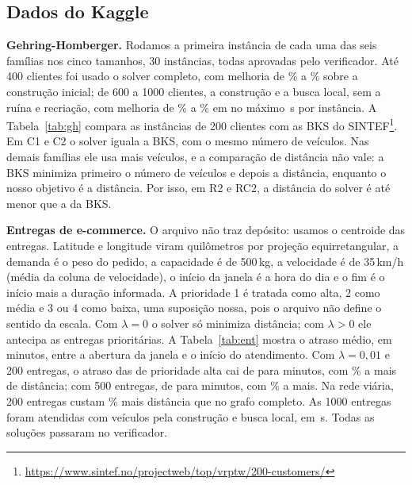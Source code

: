 \documentclass[12pt]{article}
\begin{document}
\begin{table}[!ht]
\centering
\small
\tabCvrp
\caption{Instâncias CVRP-X: solver contra a BKS (distância).}
\label{tab:cvrp}
\end{table}

\subsection{Dados do Kaggle}

\textbf{Gehring-Homberger.} Rodamos a primeira instância de cada uma das seis famílias nos cinco tamanhos, 30 instâncias, todas aprovadas pelo verificador. Até 400 clientes foi usado o solver completo, com melhoria de \ghMelhoriaMin\% a \ghMelhoriaMax\% sobre a construção inicial; de 600 a 1000 clientes, a construção e a busca local, sem a ruína e recriação, com melhoria de \ghBuscaMelhoriaMin\% a \ghBuscaMelhoriaMax\% em no máximo \ghTempoMaxBusca\,s por instância. A Tabela~\ref{tab:gh} compara as instâncias de 200 clientes com as BKS do SINTEF\footnote{\url{https://www.sintef.no/projectweb/top/vrptw/200-customers/}}. Em C1 e C2 o solver iguala a BKS, com o mesmo número de veículos. Nas demais famílias ele usa mais veículos, e a comparação de distância não vale: a BKS minimiza primeiro o número de veículos e depois a distância, enquanto o nosso objetivo é a distância. Por isso, em R2 e RC2, a distância do solver é até menor que a da BKS.

\begin{table}[!ht]
\centering
\small
\tabGH
\caption{Gehring-Homberger de 200 clientes contra a BKS; ``---'' quando o número de veículos difere.}
\label{tab:gh}
\end{table}

\textbf{Entregas de e-commerce.} O arquivo não traz depósito: usamos o centroide das entregas. Latitude e longitude viram quilômetros por projeção equirretangular, a demanda é o peso do pedido, a capacidade é de 500\,kg, a velocidade é de 35\,km/h (média da coluna de velocidade), o início da janela é a hora do dia e o fim é o início mais a duração informada. A prioridade 1 é tratada como alta, 2 como média e 3 ou 4 como baixa, uma suposição nossa, pois o arquivo não define o sentido da escala. Com $\lambda=0$ o solver só minimiza distância; com $\lambda>0$ ele antecipa as entregas prioritárias. A Tabela~\ref{tab:ent} mostra o atraso médio, em minutos, entre a abertura da janela e o início do atendimento. Com $\lambda=0{,}01$ e 200 entregas, o atraso das de prioridade alta cai de \entAltaBase{} para \entAltaPrio{} minutos, com \entDistPct\% a mais de distância; com 500 entregas, de \entAltaBaseQ{} para \entAltaPrioQ{} minutos, com \entDistPctQ\% a mais. Na rede viária, 200 entregas custam \entViarioPct\% mais distância que no grafo completo. As 1000 entregas foram atendidas com \entMil{} veículos pela construção e busca local, em \entMilTempo\,s. Todas as \entVerificadas{} soluções passaram no verificador.
\end{document}
